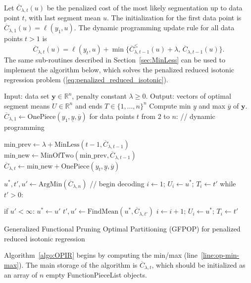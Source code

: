 \documentclass{article}
\newcommand{\RR}{\mathbb R}
\begin{document}
Let $\overline C_{\lambda,t}(u)$ be the
penalized cost of the most likely segmentation up to data point $t$,
with last segment mean $u$. The initialization for the first data
point is $\overline C_{\lambda,1}(u) = \ell(y_1, u)$. The dynamic programming update rule
for all data points $t>1$ is
\begin{equation}
  \overline C_{\lambda,t}(u) = \ell(y_t, u) + \min\{
  \overline C_{\lambda,t-1}^\leq(u) + \lambda,\, \overline C_{\lambda,t-1}(u)
  \}.
\end{equation}
The same sub-routines described in Section~\ref{sec:MinLess} can be
used to implement the algorithm below, which solves the penalized
reduced isotonic regression problem
(\ref{eq:penalized_reduced_isotonic}).
\begin{algorithm}[H]
\begin{algorithmic}[1]
\STATE Input: data set $\mathbf y\in\RR^n$, penalty constant $\lambda\geq 0$.
\STATE Output: vectors of optimal segment means $U\in\RR^{n}$ and ends $T\in\{1,\dots,n\}^{n}$
\STATE Compute min $\underline y$ and max $\overline y$ of $\mathbf y$.
\label{line:op-min-max}
\STATE $\overline C_{\lambda,1}\gets \text{OnePiece}(y_1, \underline y, \overline y)$
\STATE for data points $t$ from 2 to $n$: // dynamic programming
\label{line:for-dp-t}
\begin{ALC@g}
  \STATE $\text{min\_prev}\gets \lambda + \text{MinLess}(t-1, \overline C_{\lambda,t-1})$
  \label{line:op-MinLess}
  \STATE $\text{min\_new}\gets \text{MinOfTwo}(\text{min\_prev}, \overline C_{\lambda, t-1})$
  \label{line:op-MinOfTwo}
  \STATE $\overline C_{\lambda,t}\gets \text{min\_new} + \text{OnePiece}(y_t, \underline y, \overline y)$
  \label{line:op-AddNew}
\end{ALC@g}
\STATE $u^*,t',u'\gets \text{ArgMin}(\overline C_{\lambda,n})$ // begin decoding
\label{line:op-ArgMin}
\STATE $i\gets 1;\, U_{i}\gets u^*;\, T_{i}\gets t'$
\label{line:op-store-i}
\STATE while $t' > 0$:
\begin{ALC@g}
  \STATE if $u' < \infty$: $u^*\gets u'$
  \STATE $t',u'\gets\text{FindMean}(u^*, \overline C_{\lambda,t'})$
  \STATE $i\gets i+1;\, U_{i}\gets u^*;\, T_{i}\gets t'$
\label{line:op-i+1}
\end{ALC@g}
\caption{\label{algo:OPIR}Generalized Functional Pruning Optimal
  Partitioning (GFPOP) for penalized reduced isotonic regression}
\end{algorithmic}
\end{algorithm}

Algorithm~\ref{algo:OPIR} begins by computing the min/max
(line~\ref{line:op-min-max}). The main storage
of the algorithm is $\overline C_{\lambda, t}$, which should be
initialized as an array of $n$ empty FunctionPieceList objects. 
\end{document}
